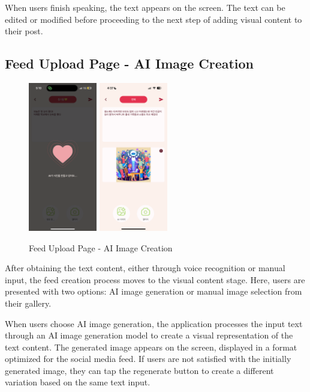         When users finish speaking, the text appears on the screen. The text can be edited or modified before proceeding to the next step of adding visual content to their post.

 \subsection{Feed Upload Page - AI Image Creation}
        \begin{figure}[htbp]
            \centerline{
            \includegraphics[width=3cm]{Images/page/creating.png}
            \includegraphics[width=3cm]{Images/page/writing.png}}
              \caption{Feed Upload Page - AI Image Creation}
            \label{fig}
        \end{figure}
        After obtaining the text content, either through voice recognition or manual input, the feed creation process moves to the visual content stage. Here, users are presented with two options: AI image generation or manual image selection from their gallery.

        When users choose AI image generation, the application processes the input text through an AI image generation model to create a visual representation of the text content. The generated image appears on the screen, displayed in a format optimized for the social media feed. If users are not satisfied with the initially generated image, they can tap the regenerate button to create a different variation based on the same text input.

